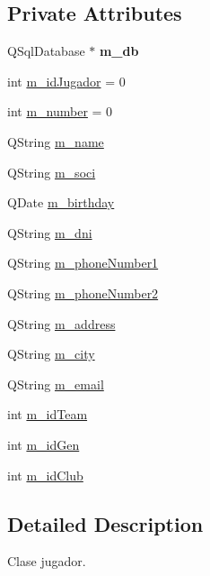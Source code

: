 \subsection*{Private Attributes}
\begin{DoxyCompactItemize}
\item 
\mbox{\label{classjugador_a4ec2678f61cfc3fef709cdf7364de864}} 
Q\+Sql\+Database $\ast$ {\bfseries m\+\_\+db}
\item 
int \mbox{\hyperlink{classjugador_a860c4f9519d760185c9387d1aaa878c3}{m\+\_\+id\+Jugador}} = 0
\item 
int \mbox{\hyperlink{classjugador_a7e760c3cafc8d788217705008219b4b5}{m\+\_\+number}} = 0
\item 
Q\+String \mbox{\hyperlink{classjugador_ab53628a425ca9e0beb632f965e3b1242}{m\+\_\+name}}
\item 
Q\+String \mbox{\hyperlink{classjugador_af17085c4ca78df6e7820c46c902a8a44}{m\+\_\+soci}}
\item 
Q\+Date \mbox{\hyperlink{classjugador_aacd583397f387472642e9fd4ac140a82}{m\+\_\+birthday}}
\item 
Q\+String \mbox{\hyperlink{classjugador_ad4740e0c58d680cd43ae162e41b901b9}{m\+\_\+dni}}
\item 
Q\+String \mbox{\hyperlink{classjugador_a1ea251ca9e7696bd7580683e5900d265}{m\+\_\+phone\+Number1}}
\item 
Q\+String \mbox{\hyperlink{classjugador_aed7290d4b5d54775a3ed94304b6f6a30}{m\+\_\+phone\+Number2}}
\item 
Q\+String \mbox{\hyperlink{classjugador_a1b6be8d5abdbf71ab907ba36c67a524f}{m\+\_\+address}}
\item 
Q\+String \mbox{\hyperlink{classjugador_a17b4e71f585da8d1e475e51ed4a7dfd4}{m\+\_\+city}}
\item 
Q\+String \mbox{\hyperlink{classjugador_a86974778b3d88602db5f2aaf5f875fdb}{m\+\_\+email}}
\item 
int \mbox{\hyperlink{classjugador_aee35082fbfb0bbde814adfd2f6f3e4ae}{m\+\_\+id\+Team}}
\item 
int \mbox{\hyperlink{classjugador_a2ff01541fe85cdbc81af2a82e5ca9360}{m\+\_\+id\+Gen}}
\item 
int \mbox{\hyperlink{classjugador_ac2789e004276f7bc979e42f087875340}{m\+\_\+id\+Club}}
\end{DoxyCompactItemize}


\subsection{Detailed Description}
Clase jugador. 

